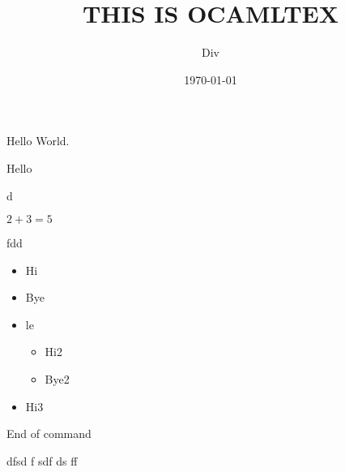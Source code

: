 \documentclass{article}
\title{THIS IS OCAMLTEX}
\author{Div}
\date{\today}
\begin{document}
\maketitle



Hello World.
\begin{comment}
 This is a comment too.
\end{comment}
Hello

\begin{comment}
 And so is this one
...

\end{comment}
d

  $2+3=5$

fdd

\begin{itemize}
\item  Hi
\item  Bye
\item  le
\begin{itemize}
\item  Hi2
\item  Bye2

\end{itemize}\item  Hi3

\end{itemize}End of command

dfsd
f
sdf
ds
ff
\end{document}
